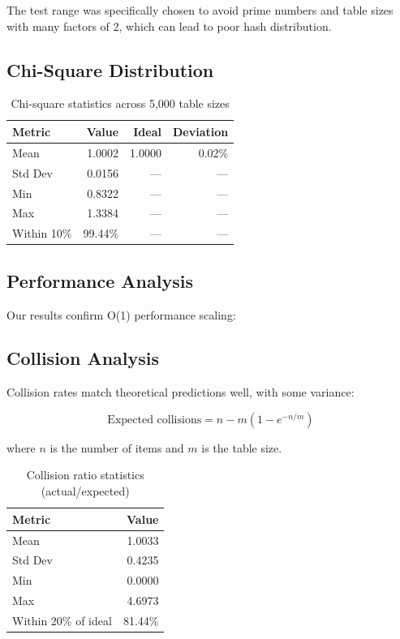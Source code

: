 \documentclass[11pt,a4paper]{article}
\theoremstyle{definition}
\begin{document}
The test range was specifically chosen to avoid prime numbers and table sizes with many factors of 2, which can lead to poor hash distribution.

\subsection{Chi-Square Distribution}

\begin{table}[h]
\centering
\caption{Chi-square statistics across 5,000 table sizes}
\begin{tabular}{@{}lrrr@{}}
\toprule
Metric & Value & Ideal & Deviation \\
\midrule
Mean & 1.0002 & 1.0000 & 0.02\% \\
Std Dev & 0.0156 & — & — \\
Min & 0.8322 & — & — \\
Max & 1.3384 & — & — \\
Within 10\% & 99.44\% & — & — \\
\bottomrule
\end{tabular}
\end{table}

\subsection{Performance Analysis}

Our results confirm O(1) performance scaling:


\subsection{Collision Analysis}

Collision rates match theoretical predictions well, with some variance:

$$\text{Expected collisions} = n - m\left(1 - e^{-n/m}\right)$$

where $n$ is the number of items and $m$ is the table size.

\begin{table}[h]
\centering
\caption{Collision ratio statistics (actual/expected)}
\begin{tabular}{@{}lr@{}}
\toprule
Metric & Value \\
\midrule
Mean & 1.0033 \\
Std Dev & 0.4235 \\
Min & 0.0000 \\
Max & 4.6973 \\
Within 20\% of ideal & 81.44\% \\
\bottomrule
\end{tabular}
\end{table}
\end{document}

